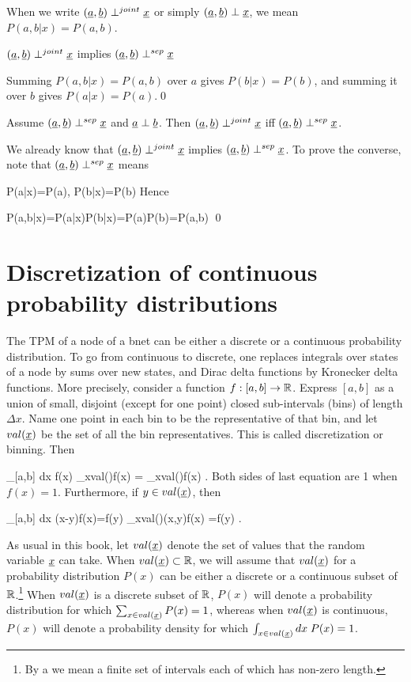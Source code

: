 When we write
$(\rva, \rvb)\perp^{joint} \rvx$
or simply $(\rva, \rvb)\perp \rvx$,
we mean $P(a,b|x)=P(a,b)$.

\begin{claim}
$(\rva, \rvb)\perp^{joint} \rvx$
implies
$(\rva, \rvb)\perp^{sep} \rvx$
\end{claim}
\proof
Summing
$P(a,b|x)=P(a,b)$
over $a$ gives
$P(b|x)=P(b)$,
and summing it
over $b$ gives
$P(a|x)=P(a)$.\qed

\begin{claim}
Assume
$(\rva,\rvb)\perp^{sep} \rvx$
and $\rva\perp\rvb$. Then
$(\rva, \rvb)\perp^{joint} \rvx$
iff
$(\rva, \rvb)\perp^{sep} \rvx$.
\end{claim}
\proof
We already know that $(\rva, \rvb)\perp^{joint}\rvx$ implies $(\rva, \rvb)\perp^{sep}\rvx$.
To prove the converse, note that
$(\rva, \rvb)\perp^{sep}\rvx$ means

\beq
P(a|x)=P(a)\;,\;\; P(b|x)=P(b)
\eeq
Hence

\beq
P(a,b|x)=P(a|x)P(b|x)=P(a)P(b)=P(a,b)
\eeq
\qed

\section{Discretization
of continuous
probability distributions}

The TPM of a node
of a bnet can be either a discrete or
a continuous probability distribution.
To go from continuous to discrete, one
replaces integrals over states of a node
 by sums over new states, and Dirac delta
functions by Kronecker delta functions.
 More precisely, consider a function
$f: [a, b]\rightarrow { \mathbb{R}}$. Express
 $[a,b]$ as
a union of
small, disjoint (except for
one point) closed sub-intervals (bins) of
length $\Delta x$.
Name one point
in each bin to be the representative of that bin,
and  let $val(\rvx)$ be the
set of all the bin representatives. This is called
discretization or binning. Then

\beq
{}
\int_{[a,b]} dx \; f(x)\rarrow
{} \sum_{x\in val(\rvx)}f(x)
=
 \sum_{x\in val(\rvx)}f(x)
 \;.
\eeq
Both sides of last equation are 1 when $f(x)=1$.
 Furthermore, if $y\in val(\rvx)$, then

\beq
\int_{[a,b]} dx \; \delta(x-y)f(x)=f(y)
\rarrow \sum_{x\in val(\rvx)}\delta(x,y)f(x)
=f(y)
\;.
\eeq

As usual in this book, let $val(\rvx)$ denote the set of
values that the random variable $\rvx$ can take.
When $val(\rvx)\subset \RR$,
we will assume that $val(\rvx)$
for a probability distribution $P(x)$
can be either a discrete or a continuous
subset of ${ \mathbb{R}}$.\footnote{By a  we
mean a finite set of intervals
 each of which has non-zero length.}
When $val(\rvx)$ is a discrete subset of ${ \mathbb{R}}$, $P(x)$
will denote a probability distribution
for which $\sum_{x\in val(\rvx)}P(x)=1$, whereas when
$val(\rvx)$ is continuous, $P(x)$ will denote
a probability density
for which $\int_{x\in val(\rvx)}dx\; P(x)=1$.

